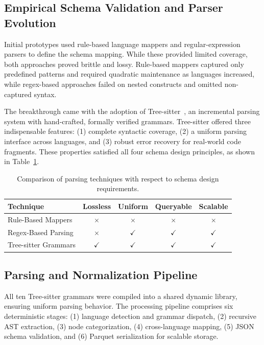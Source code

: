 \documentclass{article}
\begin{document}
\subsection{Empirical Schema Validation and Parser Evolution}
Initial prototypes used rule-based language mappers and regular-expression parsers to define the schema mapping. While these provided limited coverage, both approaches proved brittle and lossy. Rule-based mappers captured only predefined patterns and required quadratic maintenance as languages increased, while regex-based approaches failed on nested constructs and omitted non-captured syntax.  

The breakthrough came with the adoption of Tree-sitter~\cite{tree-sitter}, an incremental parsing system with hand-crafted, formally verified grammars. Tree-sitter offered three indispensable features: (1) complete syntactic coverage, (2) a uniform parsing interface across languages, and (3) robust error recovery for real-world code fragments. These properties satisfied all four schema design principles, as shown in Table~\ref{tab:parsing-comparison}.

\begin{table}[H]
\centering
\caption{Comparison of parsing techniques with respect to schema design requirements.}
\label{tab:parsing-comparison}
\begin{tabular}{lcccc}
\toprule
\textbf{Technique} & \textbf{Lossless} & \textbf{Uniform} & \textbf{Queryable} & \textbf{Scalable} \\
\midrule
Rule-Based Mappers & $\times$ & $\times$ & $\times$ & $\times$ \\
Regex-Based Parsing & $\times$ & $\checkmark$ & $\checkmark$ & $\checkmark$ \\
Tree-sitter Grammars & $\checkmark$ & $\checkmark$ & $\checkmark$ & $\checkmark$ \\
\bottomrule
\end{tabular}
\end{table}

\subsection{Parsing and Normalization Pipeline}
All ten Tree-sitter grammars were compiled into a shared dynamic library, ensuring uniform parsing behavior. The processing pipeline comprises six deterministic stages:  
(1) language detection and grammar dispatch,  
(2) recursive AST extraction,  
(3) node categorization,  
(4) cross-language mapping,  
(5) JSON schema validation, and  
(6) Parquet serialization for scalable storage.  
\end{document}
